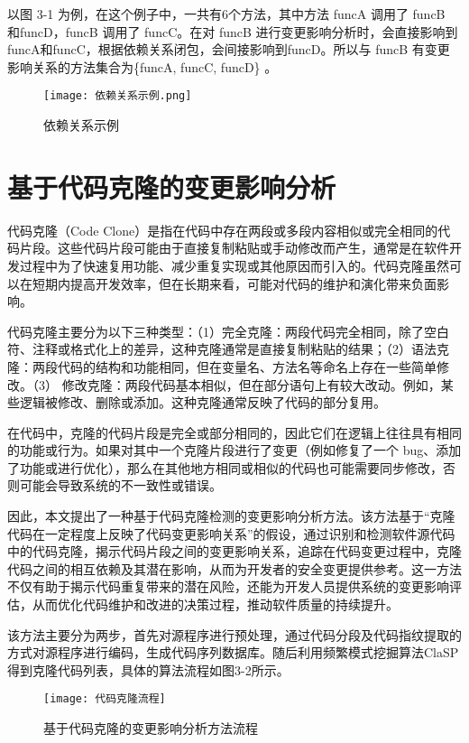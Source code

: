 以图 3-1 为例，在这个例子中，一共有6个方法，其中方法 funcA 调用了 funcB 和funcD，funcB 调用了 funcC。在对 funcB 进行变更影响分析时，会直接影响到 funcA和funcC，根据依赖关系闭包，会间接影响到funcD。所以与 funcB 有变更影响关系的方法集合为\{funcA, funcC, funcD\} 。

\begin{figure}[h]
\centering
\texttt{[image: 依赖关系示例.png]}
\caption{依赖关系示例}
\end{figure}

\section{基于代码克隆的变更影响分析}
代码克隆（Code Clone）是指在代码中存在两段或多段内容相似或完全相同的代码片段。这些代码片段可能由于直接复制粘贴或手动修改而产生，通常是在软件开发过程中为了快速复用功能、减少重复实现或其他原因而引入的。代码克隆虽然可以在短期内提高开发效率，但在长期来看，可能对代码的维护和演化带来负面影响。

代码克隆主要分为以下三种类型：（1）完全克隆：两段代码完全相同，除了空白符、注释或格式化上的差异，这种克隆通常是直接复制粘贴的结果；（2）语法克隆：两段代码的结构和功能相同，但在变量名、方法名等命名上存在一些简单修改。（3） 修改克隆：两段代码基本相似，但在部分语句上有较大改动。例如，某些逻辑被修改、删除或添加。这种克隆通常反映了代码的部分复用。


在代码中，克隆的代码片段是完全或部分相同的，因此它们在逻辑上往往具有相同的功能或行为。如果对其中一个克隆片段进行了变更（例如修复了一个 bug、添加了功能或进行优化），那么在其他地方相同或相似的代码也可能需要同步修改，否则可能会导致系统的不一致性或错误。

因此，本文提出了一种基于代码克隆检测的变更影响分析方法。该方法基于“克隆代码在一定程度上反映了代码变更影响关系”的假设，通过识别和检测软件源代码中的代码克隆，揭示代码片段之间的变更影响关系，追踪在代码变更过程中，克隆代码之间的相互依赖及其潜在影响，从而为开发者的安全变更提供参考。这一方法不仅有助于揭示代码重复带来的潜在风险，还能为开发人员提供系统的变更影响评估，从而优化代码维护和改进的决策过程，推动软件质量的持续提升。

该方法主要分为两步，首先对源程序进行预处理，通过代码分段及代码指纹提取的方式对源程序进行编码，生成代码序列数据库。随后利用频繁模式挖掘算法ClaSP得到克隆代码列表，具体的算法流程如图3-2所示。

\begin{figure}[h]
\centering
\texttt{[image: 代码克隆流程]}
\caption{基于代码克隆的变更影响分析方法流程}
\end{figure}



